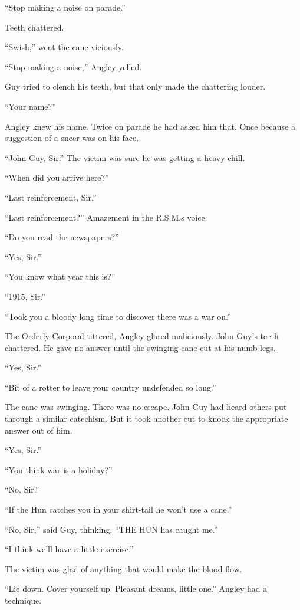 ``Stop making a noise on parade.''

Teeth chattered.

``Swish,'' went the cane viciously.

``Stop making a noise,'' Angley yelled.

Guy tried to clench his teeth, but that only made the chattering louder.

``Your name?''

Angley knew his name. Twice on parade he had asked him that. Once 
because a suggestion of a sneer was on his face.

``John Guy, Sir.'' The victim was sure he was getting a heavy chill.

``When did you arrive here?''

``Last reinforcement, Sir.''

``Last reinforcement?'' Amazement in the R.S.M.s voice.

``Do you read the newspapers?''

``Yes, Sir.''

``You know what year this is?''

``1915, Sir.''

``Took you a bloody long time to discover there was a war on.''

The Orderly Corporal tittered, Angley glared maliciously. John Guy's 
teeth chattered. He gave no answer until the swinging cane cut at his 
numb legs.

``Yes, Sir.''

``Bit of a rotter to leave your country undefended so long.''

The cane was swinging. There was no escape. John Guy had heard others 
put through a similar catechism. But it took another cut to knock the 
appropriate answer out of him.

``Yes, Sir.''

``You think war is a holiday?''

``No, Sir.''

``If the Hun catches you in your shirt-tail he won't use a cane.''

``No, Sir,'' said Guy, thinking, ``THE HUN has caught me.''

``I think we'll have a little exercise.''

The victim was glad of anything that would make the blood flow.

``Lie down. Cover yourself up. Pleasant dreams, little one.'' Angley 
had a technique.

